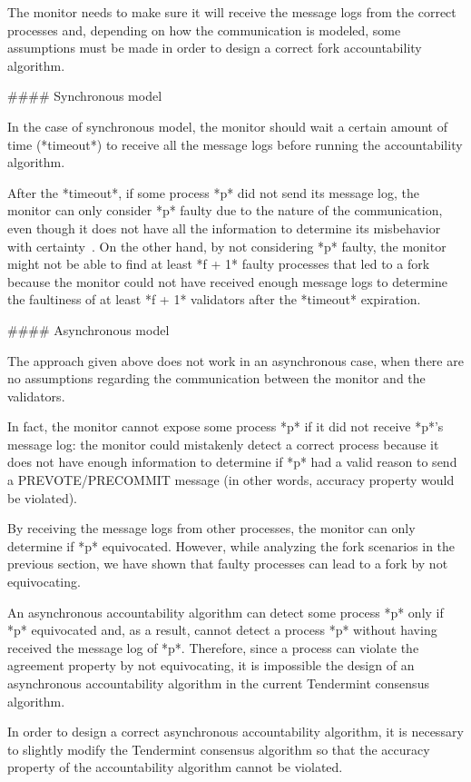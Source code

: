 \documentclass[a4paper,11pt,oneside]{report}
\begin{document}
\begin{markdown}
The monitor needs to make sure it will receive the message logs from the correct processes and, depending on how the communication is modeled, some assumptions must be made in order to design a correct fork accountability algorithm.

#### Synchronous model

In the case of synchronous model, the monitor should wait a certain amount of time (*timeout*) to receive all the message logs before running the accountability algorithm.

After the *timeout*, if some process *p* did not send its message log, the monitor can only consider *p* faulty due to the nature of the communication, even though it does not have all the information to determine its misbehavior with certainty~\cite{fork-accountability-specs}. 
On the other hand, by not considering *p* faulty, the monitor might not be able to find at least *f + 1* faulty processes that led to a fork because the monitor could not have received enough message logs to determine the faultiness of at least *f + 1* validators after the *timeout* expiration.

#### Asynchronous model

The approach given above does not work in an asynchronous case, when there are no assumptions regarding the communication between the monitor and the validators. 

In fact, the monitor cannot expose some process *p* if it did not receive *p*'s message log: the monitor could mistakenly detect a correct process because it does not have enough information to determine if *p* had a valid reason to send a PREVOTE/PRECOMMIT message (in other words, accuracy property would be violated).
 
By receiving the message logs from other processes, the monitor can only determine if *p* equivocated. 
However, while analyzing the fork scenarios in the previous section, we have shown that faulty processes can lead to a fork by not equivocating. 

An asynchronous accountability algorithm can detect some process *p* only if *p* equivocated and, as a result, cannot detect a process *p* without having received the message log of *p*. Therefore, since a process can violate the agreement property by not equivocating, it is impossible the design of an asynchronous accountability algorithm in the current Tendermint consensus algorithm.  

In order to design a correct asynchronous accountability algorithm, it is necessary to slightly modify the Tendermint consensus algorithm so that the accuracy property of the accountability algorithm cannot be violated.


\end{markdown}
\end{document}
